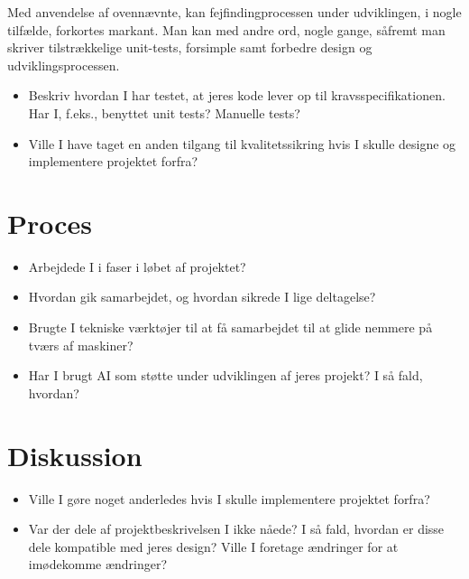 \documentclass{article}
\theoremstyle{mytheoremstyle}
\theoremstyle{mytheoremstyle}
\theoremstyle{myproblemstyle}
\begin{document}
Med anvendelse af ovennævnte, kan fejfindingprocessen under udviklingen, i nogle tilfælde, forkortes markant. Man kan med andre ord, nogle gange, såfremt man skriver tilstrækkelige unit-tests, forsimple samt forbedre design og udviklingsprocessen.

\begin{itemize}
  \item Beskriv hvordan I har testet, at jeres kode lever op til
  kravsspecifikationen. Har I, f.eks., benyttet unit tests? Manuelle tests?
  \item Ville I have taget en anden tilgang til kvalitetssikring hvis I skulle
  designe og implementere projektet forfra?
\end{itemize}

\section{Proces}\label{sec:Proces} %
\begin{itemize}
  \item Arbejdede I i faser i løbet af projektet?
  \item Hvordan gik samarbejdet, og hvordan sikrede I lige deltagelse?
  \item Brugte I tekniske værktøjer til at få samarbejdet til at glide nemmere
  på tværs af maskiner?
  \item Har I brugt AI som støtte under udviklingen af jeres projekt? I så fald,
  hvordan?
\end{itemize}

\section{Diskussion}\label{sec:Diskussion} %
\begin{itemize}
  \item Ville I gøre noget anderledes hvis I skulle implementere projektet
  forfra?
  \item Var der dele af projektbeskrivelsen I ikke nåede? I så fald, hvordan er
  disse dele kompatible med jeres design? Ville I foretage ændringer for at
  imødekomme ændringer?
\end{itemize}
\end{document}

